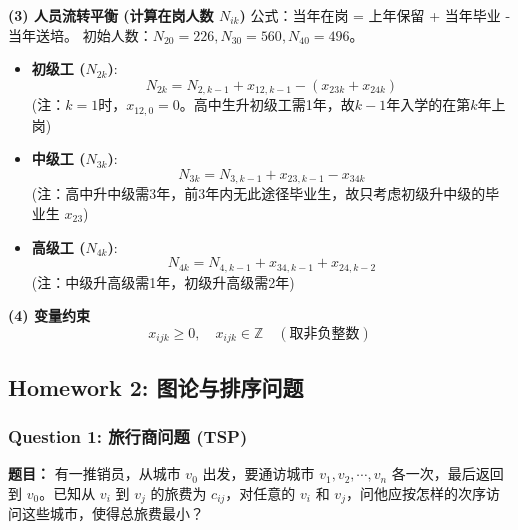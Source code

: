 \documentclass[a4paper,12pt]{ctexart} %
\begin{document}
	\textbf{(3) 人员流转平衡 (计算在岗人数 $N_{ik}$)}
	公式：当年在岗 = 上年保留 + 当年毕业 - 当年送培。
	初始人数：$N_{20}=226, N_{30}=560, N_{40}=496$。
	
	\begin{itemize}
		\item \textbf{初级工 ($N_{2k}$)}:
		\[ N_{2k} = N_{2,k-1} + x_{12,k-1} - (x_{23k} + x_{24k}) \]
		(注：$k=1$时，$x_{12,0}=0$。高中生升初级工需1年，故$k-1$年入学的在第$k$年上岗)
		
		\item \textbf{中级工 ($N_{3k}$)}:
		\[ N_{3k} = N_{3,k-1} + x_{23,k-1} - x_{34k} \]
		(注：高中升中级需3年，前3年内无此途径毕业生，故只考虑初级升中级的毕业生 $x_{23}$)
		
		\item \textbf{高级工 ($N_{4k}$)}:
		\[ N_{4k} = N_{4,k-1} + x_{34,k-1} + x_{24,k-2} \]
		(注：中级升高级需1年，初级升高级需2年)
	\end{itemize}
	
	\textbf{(4) 变量约束}
	\[ x_{ijk} \ge 0, \quad x_{ijk} \in \mathbb{Z} \quad (\text{取非负整数}) \]
	
	\subsection{Homework 2: 图论与排序问题}
	
	\subsubsection*{Question 1: 旅行商问题 (TSP)}
	\textbf{题目：} 有一推销员，从城市 $v_0$ 出发，要通访城市 $v_1, v_2, \cdots, v_n$ 各一次，最后返回到 $v_0$。已知从 $v_i$ 到 $v_j$ 的旅费为 $c_{ij}$，对任意的 $v_i$ 和 $v_j$，问他应按怎样的次序访问这些城市，使得总旅费最小？
	
\end{document}
